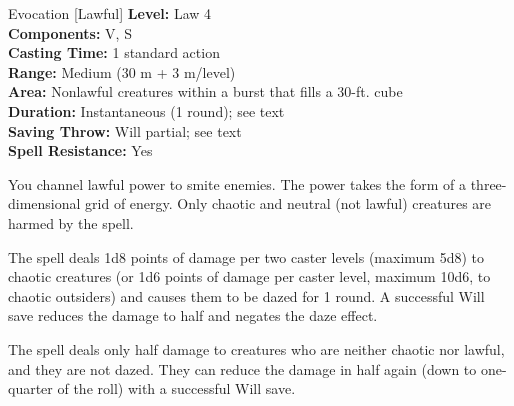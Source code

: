 {Evocation [Lawful]}
{
	\textbf{Level:}
	Law 4\\
	\textbf{Components:}
	V, S\\
	\textbf{Casting Time:}
	1 standard action\\
	\textbf{Range:}
	Medium (30 m + 3 m/level)\\
	\textbf{Area:}
	Nonlawful creatures within a burst that fills a 30-ft. cube\\
	\textbf{Duration:}
	Instantaneous (1 round); see text\\
	\textbf{Saving Throw:}
	Will partial; see text\\
	\textbf{Spell Resistance:}
	Yes\\
}
{
	You channel lawful power to smite enemies. The power takes the form of a three-dimensional grid of energy. Only chaotic and neutral (not lawful) creatures are harmed by the spell.

	The spell deals 1d8 points of damage per two caster levels (maximum 5d8) to chaotic creatures (or 1d6 points of damage per caster level, maximum 10d6, to chaotic outsiders) and causes them to be dazed for 1 round. A successful Will save reduces the damage to half and negates the daze effect.

	The spell deals only half damage to creatures who are neither chaotic nor lawful, and they are not dazed. They can reduce the damage in half again (down to one-quarter of the roll) with a successful Will save.

}
